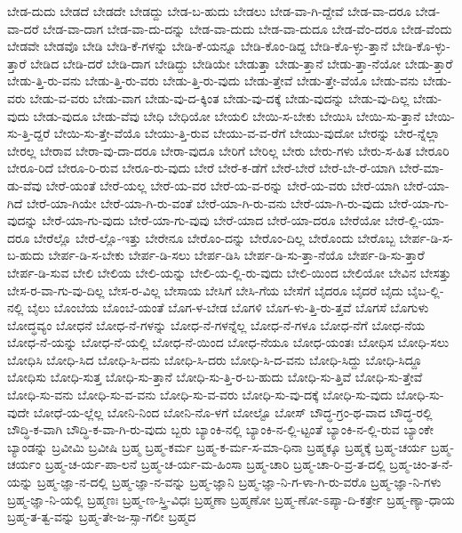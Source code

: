 {ಬೇಡ-ದುದು
ಬೇಡದೆ
ಬೇಡದೇ
ಬೇಡದ್ದು
ಬೇಡ-ಬ-ಹುದು
ಬೇಡಲು
ಬೇಡ-ವಾ-ಗಿ-ದ್ದೇವೆ
ಬೇಡ-ವಾ-ದರೂ
ಬೇಡ-ವಾ-ದರೆ
ಬೇಡ-ವಾ-ದಾಗ
ಬೇಡ-ವಾ-ದು-ದನ್ನು
ಬೇಡ-ವಾ-ದುದು
ಬೇಡ-ವಾ-ದುದೂ
ಬೇಡ-ವೆಂ-ದರೂ
ಬೇಡ-ವೆಂದು
ಬೇಡವೇ
ಬೇಡವೊ
ಬೇಡಿ
ಬೇಡಿ-ಕೆ-ಗಳನ್ನು
ಬೇಡಿ-ಕೆ-ಯನ್ನೂ
ಬೇಡಿ-ಕೊಂ-ಡಿದ್ದ
ಬೇಡಿ-ಕೊ-ಳ್ಳು-ತ್ತಾನೆ
ಬೇಡಿ-ಕೊ-ಳ್ಳು-ತ್ತಾರೆ
ಬೇಡಿದ
ಬೇಡಿ-ದರೆ
ಬೇಡಿ-ದಾಗ
ಬೇಡಿದ್ದು
ಬೇಡಿಯೇ
ಬೇಡುತ್ತಾ
ಬೇಡು-ತ್ತಾನೆ
ಬೇಡು-ತ್ತಾ-ನೆಯೋ
ಬೇಡು-ತ್ತಾರೆ
ಬೇಡು-ತ್ತಿ-ರು-ವನು
ಬೇಡು-ತ್ತಿ-ರು-ವರು
ಬೇಡು-ತ್ತಿ-ರು-ವುದು
ಬೇಡು-ತ್ತೇವೆ
ಬೇಡು-ತ್ತೇ-ವೆಯೊ
ಬೇಡು-ವನು
ಬೇಡು-ವರು
ಬೇಡು-ವ-ವರು
ಬೇಡು-ವಾಗ
ಬೇಡು-ವು-ದ-ಕ್ಕಿಂತ
ಬೇಡು-ವು-ದಕ್ಕೆ
ಬೇಡು-ವುದನ್ನು
ಬೇಡು-ವು-ದಿಲ್ಲ
ಬೇಡು-ವುದು
ಬೇಡು-ವುದೂ
ಬೇಡು-ವೆವು
ಬೇಧಿ
ಬೇಧಿಯೋ
ಬೇಯಲಿ
ಬೇಯಿ-ಸ-ಬೇಕು
ಬೇಯಿಸಿ
ಬೇಯಿ-ಸು-ತ್ತಾನೆ
ಬೇಯಿ-ಸು-ತ್ತಿ-ದ್ದರೆ
ಬೇಯಿ-ಸು-ತ್ತೇ-ವೆಯೊ
ಬೇಯು-ತ್ತಿ-ರುವ
ಬೇಯು-ವ-ವ-ರೆಗೆ
ಬೇಯು-ವುದೋ
ಬೇರನ್ನು
ಬೇರ-ನ್ನೆಲ್ಲಾ
ಬೇರಲ್ಲ
ಬೇರಾವ
ಬೇರಾ-ವು-ದಾ-ದರೂ
ಬೇರಾ-ವುದೂ
ಬೇರಿಗೆ
ಬೇರಿಲ್ಲ
ಬೇರು
ಬೇರು-ಗಳು
ಬೇರು-ಸ-ಹಿತ
ಬೇರೂರಿ
ಬೇರೂ-ರಿದೆ
ಬೇರೂ-ರಿ-ರುವ
ಬೇರೂ-ರು-ವುದು
ಬೇರೆ
ಬೇರೆ-ಕ-ಡೆಗೆ
ಬೇರೆ-ಬೇರೆ
ಬೇರೆ-ಬೇ-ರೆ-ಯಾಗಿ
ಬೇರೆ-ಮಾ-ಡು-ವೆವು
ಬೇರೆ-ಯಂತೆ
ಬೇರೆ-ಯಲ್ಲ
ಬೇರೆ-ಯ-ವರ
ಬೇರೆ-ಯ-ವ-ರನ್ನು
ಬೇರೆ-ಯ-ವರು
ಬೇರೆ-ಯಾಗಿ
ಬೇರೆ-ಯಾ-ಗಿದೆ
ಬೇರೆ-ಯಾ-ಗಿಯೇ
ಬೇರೆ-ಯಾ-ಗಿ-ರು-ವಂತೆ
ಬೇರೆ-ಯಾ-ಗಿ-ರು-ವನು
ಬೇರೆ-ಯಾ-ಗಿ-ರು-ವುದು
ಬೇರೆ-ಯಾ-ಗು-ವುದನ್ನು
ಬೇರೆ-ಯಾ-ಗು-ವುದು
ಬೇರೆ-ಯಾ-ಗು-ವುವು
ಬೇರೆ-ಯಾದ
ಬೇರೆ-ಯಾ-ದರೂ
ಬೇರೆಯೋ
ಬೇರೆ-ಲ್ಲಿ-ಯಾ-ದರೂ
ಬೇರೆಲ್ಲೊ
ಬೇರೆ-ಲ್ಲೊ-ಇತ್ತು
ಬೇರೇನೂ
ಬೇರೊಂ-ದನ್ನು
ಬೇರೊಂ-ದಿಲ್ಲ
ಬೇರೊಂದು
ಬೇರೊಬ್ಬ
ಬೇರ್ಪ-ಡಿ-ಸ-ಬ-ಹುದು
ಬೇರ್ಪ-ಡಿ-ಸ-ಬೇಕು
ಬೇರ್ಪ-ಡಿ-ಸಲು
ಬೇರ್ಪ-ಡಿಸಿ
ಬೇರ್ಪ-ಡಿ-ಸು-ತ್ತಾ-ನೆಯೊ
ಬೇರ್ಪ-ಡಿ-ಸು-ತ್ತಾರೆ
ಬೇರ್ಪ-ಡಿ-ಸುವ
ಬೇಲಿ
ಬೇಲಿಯ
ಬೇಲಿ-ಯನ್ನು
ಬೇಲಿ-ಯ-ಲ್ಲಿ-ರು-ವುದು
ಬೇಲಿ-ಯಿಂದ
ಬೇಲಿಯೋ
ಬೇವಿನ
ಬೇಸತ್ತು
ಬೇಸ-ರ-ವಾ-ಗು-ವು-ದಿಲ್ಲ
ಬೇಸ-ರ-ವಿಲ್ಲ
ಬೇಸಾಯ
ಬೇಸಿಗೆ
ಬೇಸಿ-ಗೆಯ
ಬೇಸೆಗೆ
ಬೈದರೂ
ಬೈದರೆ
ಬೈದು
ಬೈಬ-ಲ್ಲಿ-ನಲ್ಲಿ
ಬೈಲು
ಬೊಂಬೆಯ
ಬೊಂಬೆ-ಯಂತೆ
ಬೊಗ-ಳ-ಬೇಡ
ಬೊಗಳಿ
ಬೊಗ-ಳು-ತ್ತಿ-ರು-ತ್ತವೆ
ಬೊಗಸೆ
ಬೊಗುಳು
ಬೋದ್ಧವ್ಯಂ
ಬೋಧನೆ
ಬೋಧ-ನೆ-ಗಳನ್ನು
ಬೋಧ-ನೆ-ಗಳನ್ನೆಲ್ಲ
ಬೋಧ-ನೆ-ಗಳೂ
ಬೋಧ-ನೆಗೆ
ಬೋಧ-ನೆಯ
ಬೋಧ-ನೆ-ಯನ್ನು
ಬೋಧ-ನೆ-ಯಲ್ಲಿ
ಬೋಧ-ನೆ-ಯಿಂದ
ಬೋಧ-ನೆಯೂ
ಬೋಧ-ಯಂತಃ
ಬೋಧಿಸ
ಬೋಧಿ-ಸಲು
ಬೋಧಿಸಿ
ಬೋಧಿ-ಸಿದ
ಬೋಧಿ-ಸಿ-ದನು
ಬೋಧಿ-ಸಿ-ದರು
ಬೋಧಿ-ಸಿ-ದ-ವನು
ಬೋಧಿ-ಸಿದ್ದು
ಬೋಧಿ-ಸಿದ್ದೂ
ಬೋಧಿಸು
ಬೋಧಿ-ಸುತ್ತ
ಬೋಧಿ-ಸು-ತ್ತಾನೆ
ಬೋಧಿ-ಸು-ತ್ತಿ-ರ-ಬ-ಹುದು
ಬೋಧಿ-ಸು-ತ್ತಿವೆ
ಬೋಧಿ-ಸು-ತ್ತೇವೆ
ಬೋಧಿ-ಸು-ವನು
ಬೋಧಿ-ಸು-ವ-ವನು
ಬೋಧಿ-ಸು-ವ-ವರು
ಬೋಧಿ-ಸು-ವು-ದಕ್ಕೆ
ಬೋಧಿ-ಸು-ವುದು
ಬೋಧಿ-ಸು-ವುದೇ
ಬೋಧೆ-ಯ-ಲ್ಲೆಲ್ಲ
ಬೋನಿ-ನಿಂದ
ಬೋನಿ-ನೊ-ಳಗೆ
ಬೋಲ್ಟೊ
ಬೋಸ್
ಬೌದ್ಧ-ಗ್ರಂ-ಥ-ವಾದ
ಬೌದ್ಧ-ರಲ್ಲಿ
ಬೌದ್ಧಿ-ಕ-ವಾಗಿ
ಬೌದ್ಧಿ-ಕ-ವಾ-ಗಿ-ರು-ವುದು
ಬ್ಬರು
ಬ್ಯಾಂಕಿ-ನಲ್ಲಿ
ಬ್ಯಾಂಕಿ-ನ-ಲ್ಲಿ-ಟ್ಟಂತೆ
ಬ್ಯಾಂಕಿ-ನ-ಲ್ಲಿ-ರುವ
ಬ್ಯಾಂಕೇ
ಬ್ಯಾಂಡನ್ನು
ಬ್ರವೀಮಿ
ಬ್ರವೀಷಿ
ಬ್ರಹ್ಮ
ಬ್ರಹ್ಮ-ಕರ್ಮ
ಬ್ರಹ್ಮ-ಕ-ರ್ಮ-ಸ-ಮಾ-ಧಿನಾ
ಬ್ರಹ್ಮಕ್ಕೂ
ಬ್ರಹ್ಮಕ್ಕೆ
ಬ್ರಹ್ಮ-ಚರ್ಯ
ಬ್ರಹ್ಮ-ಚರ್ಯಂ
ಬ್ರಹ್ಮ-ಚ-ರ್ಯ-ಪಾ-ಲನೆ
ಬ್ರಹ್ಮ-ಚ-ರ್ಯ-ಮ-ಹಿಂಸಾ
ಬ್ರಹ್ಮ-ಚಾರಿ
ಬ್ರಹ್ಮ-ಚಾ-ರಿ-ವ್ರ-ತ-ದಲ್ಲಿ
ಬ್ರಹ್ಮ-ಚಿಂ-ತ-ನೆ-ಯನ್ನು
ಬ್ರಹ್ಮ-ಜ್ಞಾ-ನ-ದಲ್ಲಿ
ಬ್ರಹ್ಮ-ಜ್ಞಾ-ನ-ವನ್ನು
ಬ್ರಹ್ಮ-ಜ್ಞಾನಿ
ಬ್ರಹ್ಮ-ಜ್ಞಾ-ನಿ-ಗ-ಳಾ-ಗಿ-ರು-ವರೊ
ಬ್ರಹ್ಮ-ಜ್ಞಾ-ನಿ-ಗಳು
ಬ್ರಹ್ಮ-ಜ್ಞಾ-ನಿ-ಯಲ್ಲಿ
ಬ್ರಹ್ಮಣಃ
ಬ್ರಹ್ಮ-ಣ-ಸ್ತ್ರಿ-ವಿಧಃ
ಬ್ರಹ್ಮಣಾ
ಬ್ರಹ್ಮಣೋ
ಬ್ರಹ್ಮ-ಣೋ-ಽಪ್ಯಾ-ದಿ-ಕರ್ತ್ರೇ
ಬ್ರಹ್ಮ-ಣ್ಯಾ-ಧಾಯ
ಬ್ರಹ್ಮ-ತ-ತ್ವ-ವನ್ನು
ಬ್ರಹ್ಮ-ತೇ-ಜ-ಸ್ಸಾ-ಗಲೀ
ಬ್ರಹ್ಮದ
}
